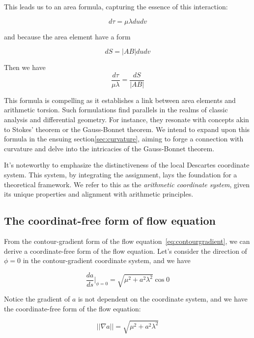 This leads us to an area formula, capturing the essence of this interaction:

\begin{equation}
    d\tau = \mu \lambda du dv \label{eq:area_formula}
\end{equation}

and because the area element have a form

\begin{equation}
    dS = |AB| du dv \label{eq:area_element}
\end{equation}

Then we have
\begin{equation}
    \frac{d\tau}{\mu \lambda} = \frac{dS}{|AB|}\label{eq:area_formula2}
\end{equation}

This formula is compelling as it establishes a link between area elements and arithmetic torsion.
Such formulations find parallels in the realms of classic analysis and differential geometry.
For instance, they resonate with concepts akin to Stokes' theorem or the Gauss-Bonnet theorem.
We intend to expand upon this formula in the ensuing section\ref{sec:curvature},
aiming to forge a connection with curvature and delve into the intricacies of the Gauss-Bonnet theorem.

It's noteworthy to emphasize the distinctiveness of the local Descartes coordinate system.
This system, by integrating the assignment, lays the foundation for a theoretical framework.
We refer to this as the \emph{arithmetic coordinate system}, given its unique properties and alignment with arithmetic principles.

\subsection{The coordinat-free form of flow equation}\label{subsec:coordinate-free}

From the contour-gradient form of the flow equation~\eqref{eq:contourgradient}, we can derive a coordinate-free form of the flow equation.
Let's consider the direction of \(\phi = 0\) in the contour-gradient coordinate system, and we have

\[
    \frac{da}{ds}|_{\phi = 0} = \sqrt{\mu^2 + a^2 \lambda^2} \cos 0
\]

Notice the gradient of \(a\) is not dependent on the coordinate system, and we have the coordinate-free form of the flow equation:

\begin{equation}\label{eq:coordinate-free}
||\nabla a|| = \sqrt{\mu^2 + a^2 \lambda^2}
\end{equation}

